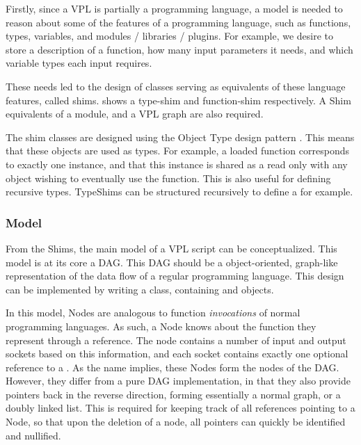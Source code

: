 Firstly, since a VPL is partially a programming language, a model is needed to reason about some of the features of a programming language, such as functions, types, variables, and modules / libraries / plugins.
For example, we desire to store a description of a function, how many input parameters it needs, and which variable types each input requires. 

These needs led to the design of classes serving as equivalents of these language features, called shims. 
 shows a type-shim and function-shim respectively. 
A Shim equivalents of a module, and a VPL graph are also required. 

The shim classes are designed using the Object Type design pattern \citep{gamma_design_1994}. 
This means that these objects are used as types. 
For example, a loaded function corresponds to exactly one  instance, and that this instance is shared as a read only with any object wishing to eventually use the function. 
This is also useful for defining recursive types. 
TypeShims can be structured recursively to define a  for example. 



\subsubsection*{Model}
\label{sec:method-model}


From the Shims, the main model of a VPL script can be conceptualized. 
This model is at its core a \ac{DAG}. 
This \ac{DAG} should be a object-oriented, graph-like representation of the data flow of a regular programming language. 
This design can be implemented by writing a  class, containing  and  objects. 

In this model, Nodes are analogous to function \emph{invocations} of normal programming languages. 
As such, a Node knows about the function they represent through a  reference. 
The node contains a number of input and output sockets based on this information, and each socket contains exactly one optional reference to a .  
As the name implies, these Nodes form the nodes of the DAG. 
However, they differ from a pure DAG implementation, in that they also provide pointers back in the reverse direction, forming essentially a normal graph, or a doubly linked list. 
This is required for keeping track of all references pointing to a Node, so that upon the deletion of a node, all pointers can quickly be identified and nullified.

